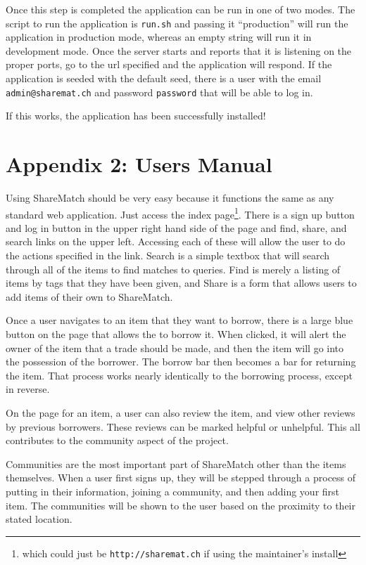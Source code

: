 \documentclass{acm_proc_article-sp}
\begin{document}
Once this step is completed the application can be run in one of two modes.  The script to run the application is \texttt{run.sh} and passing it ``production'' will run the application in production mode, whereas an empty string will run it in development mode. Once the server starts and reports that it is listening on the proper ports, go to the url specified and the application will respond.  If the application is seeded with the default seed, there is a user with the email \texttt{admin@sharemat.ch} and password \texttt{password} that will be able to log in.

If this works, the application has been successfully installed!
\section{Appendix 2: Users Manual}
Using ShareMatch should be very easy because it functions the same as any standard web application.  Just access the index page\footnote{which could just be \texttt{http://sharemat.ch} if using the maintainer's install}.  There is a sign up button and log in button in the upper right hand side of the page and find, share, and search links on the upper left. Accessing each of these will allow the user to do the actions specified in the link.  Search is a simple textbox that will search through all of the items to find matches to queries.  Find is merely a listing of items by tags that they have been given, and Share is a form that allows users to add items of their own to ShareMatch.

Once a user navigates to an item that they want to borrow, there is a large blue button on the page that allows the to borrow it.  When clicked, it will alert the owner of the item that a trade should be made, and then the item will go into the possession of the borrower.  The borrow bar then becomes a bar for returning the item.  That process works nearly identically to the borrowing process, except in reverse.

On the page for an item, a user can also review the item, and view other reviews by previous borrowers.   These reviews can be marked helpful or unhelpful.  This all contributes to the community aspect of the project.  

Communities are the most important part of ShareMatch other than the items themselves.  When a user first signs up, they will be stepped through a process of putting in their information, joining a community, and then adding your first item.  The communities will be shown to the user based on the proximity to their stated location.
\end{document}

